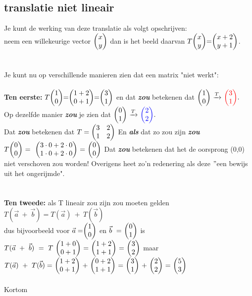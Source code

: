 \subsection{translatie niet lineair}
Je kunt de werking van deze translatie als volgt opschrijven:\\ neem een willekeurige vector $ \vectwee{x}{y} $ dan is het beeld daarvan $ T \vectwee{x}{y} = \vectwee{x+2}{y+1} $.\\ \\ \\
Je kunt nu op verschillende manieren zien dat een matrix "niet werkt":\\ \\
\textbf{ Ten eerste:} $ T \vectwee{1}{0} = \vectwee{1+2}{0+1} = \vectwee{3}{1} $ en dat \textit{\textbf{zou}} betekenen dat 
$ \vectwee{1}{0}  \  \xrightarrow{T}   \   \vectwee[red]{ 3 } {1}. $ \\ Op dezelfde manier \textit{\textbf{zou}} je zien dat  
$ \vectwee{0}{1}  \  \xrightarrow{T}   \   \vectwee[blue]{ 2 } {2}. $ \\ Dat \textbf{\textit{zou}} betekenen dat 
$ T = \begin{pmatrix}  3 & 2  \\  1 & 2  \end{pmatrix} $ En \textbf{\textit{als}} dat zo zou zijn \textbf{\textit{zou}} 
$  T \vectwee{0}{0} \ = \ 
\ \vectwee{ 3\cdot 0 + 2\cdot 0 }{ 1\cdot 0 + 2\cdot 0 } \ 
= \ \vectwee{0}{0} $ Dat \textbf{\textit{zou}} betekenen dat het de oorsprong (0,0) niet verschoven zou worden! Overigens heet zo'n redenering als deze  $"$een bewijs uit het ongerijmde".\\ \\ \\
\textbf{Ten tweede:} als T lineair zou zijn zou moeten gelden\\ 
$ T(\vec{a} \ + \ \vec{b} )  
=  T(\vec{a}) \ + \ T(\vec{b}) $ \\ dus bijvoorbeeld voor $ \vec{a} = \vectwee{1}{0} $ en   
$ \vec{b} \ = \ \vectwee{0}{1} $  is \\ 
$ T(\vec{a} \ + \ \vec{b} ) \ 
= \ T \ \vectwee{1+0}{0+1} \ 
= \  \vectwee{1+2}{1+1} \ 
= \ \vectwee{3}{2}  $ 
\quad maar \\
$ T(\vec{a}) \ + \ T(\vec{b}) 
= \  \vectwee{1+2}{0+1} \  + \  \vectwee{0+2}{1+1} \ 
= \  \vectwee{3}{1} \ + \  \vectwee{2}{2} \ 
= \  \vectwee{5}{3} \ 
$\\ \\
Kortom 

